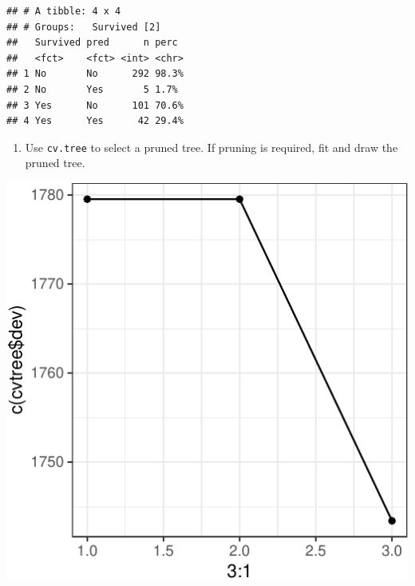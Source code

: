 \documentclass[]{article}
\newenvironment{Shaded}{\begin{snugshade}}{\end{snugshade}}
\newcommand{\DataTypeTok}[1]{\textcolor[rgb]{0.13,0.29,0.53}{#1}}
\newcommand{\DecValTok}[1]{\textcolor[rgb]{0.00,0.00,0.81}{#1}}
\newcommand{\KeywordTok}[1]{\textcolor[rgb]{0.13,0.29,0.53}{\textbf{#1}}}
\newcommand{\NormalTok}[1]{#1}
\newcommand{\OperatorTok}[1]{\textcolor[rgb]{0.81,0.36,0.00}{\textbf{#1}}}
\newcommand{\StringTok}[1]{\textcolor[rgb]{0.31,0.60,0.02}{#1}}
\providecommand{\tightlist}{%
  \setlength{\itemsep}{0pt}\setlength{\parskip}{0pt}}
\begin{document}
\begin{verbatim}
## # A tibble: 4 x 4
## # Groups:   Survived [2]
##   Survived pred      n perc 
##   <fct>    <fct> <int> <chr>
## 1 No       No      292 98.3%
## 2 No       Yes       5 1.7% 
## 3 Yes      No      101 70.6%
## 4 Yes      Yes      42 29.4%
\end{verbatim}

\begin{enumerate}
\def\labelenumi{(\alph{enumi})}
\setcounter{enumi}{1}
\tightlist
\item
  Use \texttt{cv.tree} to select a pruned tree. If pruning is required,
  fit and draw the pruned tree.
\end{enumerate}

\begin{Shaded}
\end{Shaded}

\begin{center}\includegraphics{sol_A4_files/figure-latex/unnamed-chunk-23-1} \end{center}
\end{document}
